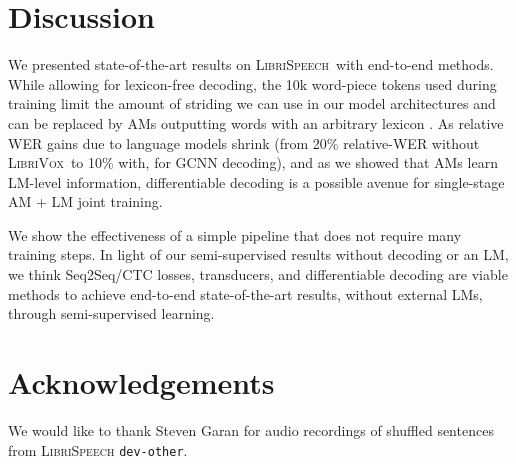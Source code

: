 \documentclass{article}
\def\devother{\texttt{dev-other}}
\newcommand{\librivox}{\textsc{LibriVox}}
\newcommand{\librispeech}{\textsc{LibriSpeech}}
\begin{document}
\section{Discussion}
\label{sec:discussion}
We presented state-of-the-art results on \librispeech~with end-to-end methods.
While allowing for lexicon-free decoding, the 10k word-piece tokens used during training limit the amount of striding we can use in our model architectures and can be replaced by AMs outputting words with an arbitrary lexicon \cite{collobert2019word}. As relative WER gains due to language models shrink (from 20\% relative-WER without \librivox~to 10\% with, for GCNN decoding), and as we showed that AMs learn LM-level information, differentiable decoding \cite{collobert2019diffdec}
is a possible avenue for single-stage AM + LM joint training.

We show the effectiveness of a simple pipeline
that does not require many training steps. In light of our semi-supervised results without decoding or an LM, we think Seq2Seq/CTC losses, transducers, and differentiable decoding are viable methods to achieve end-to-end state-of-the-art results, without external LMs, through semi-supervised learning.

\section{Acknowledgements}
We would like to thank Steven Garan for audio recordings of shuffled sentences from \librispeech{} \devother{}.
\end{document}
